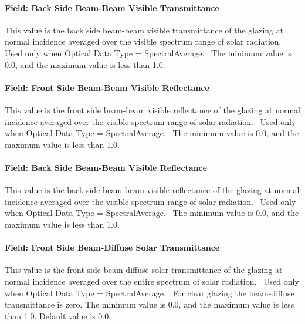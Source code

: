 \paragraph{Field: Back Side Beam-Beam Visible Transmittance}\label{field-back-side-beam-beam-visible-transmittance}

This value is the back side beam-beam visible transmittance of the glazing at normal incidence averaged over the visible spectrum range of solar radiation.~ Used only when Optical Data Type = SpectralAverage.~ The minimum value is 0.0, and the maximum value is less than 1.0.

\paragraph{Field: Front Side Beam-Beam Visible Reflectance}\label{field-front-side-beam-beam-visible-reflectance}

This value is the front side beam-beam visible reflectance of the glazing at normal incidence averaged over the visible spectrum range of solar radiation.~ Used only when Optical Data Type = SpectralAverage.~ The minimum value is 0.0, and the maximum value is less than 1.0.

\paragraph{Field: Back Side Beam-Beam Visible Reflectance}\label{field-back-side-beam-beam-visible-reflectance}

This value is the back side beam-beam visible reflectance of the glazing at normal incidence averaged over the visible spectrum range of solar radiation.~ Used only when Optical Data Type = SpectralAverage.~ The minimum value is 0.0, and the maximum value is less than 1.0.

\paragraph{Field: Front Side Beam-Diffuse Solar Transmittance}\label{field-front-side-beam-diffuse-solar-transmittance}

This value is the front side beam-diffuse solar transmittance of the glazing at normal incidence averaged over the entire spectrum of solar radiation.~ Used only when Optical Data Type = SpectralAverage.~ For clear glazing the beam-diffuse transmittance is zero. The minimum value is 0.0, and the maximum value is less than 1.0. Default value is 0.0.

